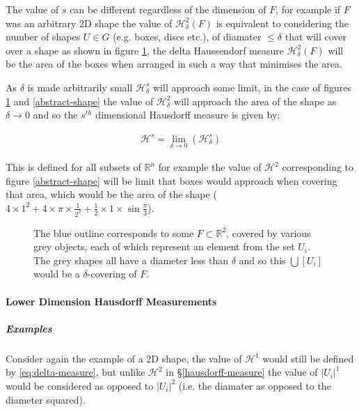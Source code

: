 \documentclass[a4paper,11pt,twoside]{article}
\begin{document}
The value of \(s\) can be different regardless of the dimension of \(F\), for example if \(F\) was an arbitrary 2D shape the value of \(\mathcal{H}_{\delta}^{2}\left(F\right)\)
is equivalent to considering the number of shapes \(U\in G\) (e.g. boxes, discs etc.), of
diamater \(\leq \delta\) that will cover over a shape as shown in figure
\ref{hausdorff-covering}, the delta Haussendorf measure
\(\mathcal{H}^{2}_{\delta} \left(F\right)\) will be the area of the boxes when
arranged in such a way that minimises the area.

As \(\delta\) is made arbitrarily small \(\mathcal{H}_{\delta}^{s}\) will approach some limit, in the case of figures \ref{hausdorff-covering}  and \ref{abstract-shape} the value of \(\mathcal{H}^{2}_{\delta}\) will approach the area of the shape as \(\delta \rightarrow 0\) and so the \(s^{th}\) dimensional Hausdorff measure is given by:

\begin{align}
\mathcal{H}^{s} = \lim_{\delta \rightarrow 0}\left( \mathcal{H}^{s}_{\delta} \right) \label{eq:limit-haus}
\end{align}

This is defined for all subsets of \(\mathbb{R}^n\) for example the value of  \(\mathcal{H}^{2}\) corresponding to figure \ref{abstract-shape} will be limit that boxes would approach when covering that area, which would be the area of the shape (\(4\times 1^2 + 4\times \pi\times \frac{1}{2^2} + \frac{1}{2}\times 1 \times \sin{\frac{\pi}{3}}\)).





\begin{figure}
\centering

\caption{\label{hausdorff-covering}The blue outline corresponds to some \(F \subset \mathbb{R}^{2}\), covered by various grey objects, each of which represent an element from the set \(U_{i}\). The grey shapes all have a diameter less than \(\delta\) and so this  \(\bigcup \left[U_{i}\right]\) would be a \(\delta\)-covering of \(F\).}
\end{figure}




\paragraph{Lower Dimension Hausdorff Measurements}
\label{sec:org1565e46}
\subparagraph{Examples}
\label{sec:org5f26df3}
Consider again the example of a 2D shape, the value of \(\mathcal{H}^{1}\) would still be defined by \eqref{eq:delta-measure}, but unlike \(\mathcal{H}^{2}\) in \S \ref{hausdorff-measure} the value of \(\left\lvert U_i \right\rvert^1\) would be considered as opposed to \(\left\lvert U_i \right\rvert^2\) (i.e. the diamater as opposed to the diameter squared).
\end{document}
